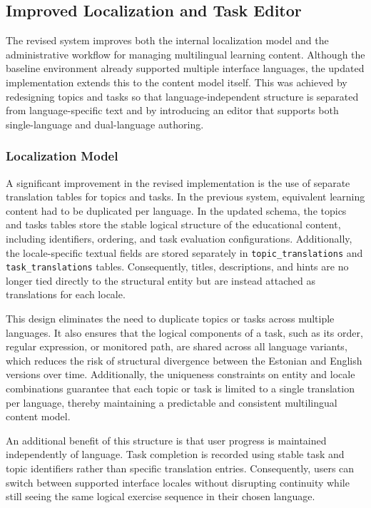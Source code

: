 \subsection{Improved Localization and Task Editor} \label{subsec:improved-localization-and-task-editor}
The revised system improves both the internal localization model and the administrative workflow for managing multilingual learning content.
Although the baseline environment already supported multiple interface languages, the updated implementation extends this to the content model itself.
This was achieved by redesigning topics and tasks so that language-independent structure is separated from language-specific text and by introducing an editor that supports both single-language and dual-language authoring.

\subsubsection{Localization Model} \label{subsubsec:localization-model}
A significant improvement in the revised implementation is the use of separate translation tables for topics and tasks.
In the previous system, equivalent learning content had to be duplicated per language.
In the updated schema, the topics and tasks tables store the stable logical structure of the educational content, including identifiers, ordering, and task evaluation configurations.
Additionally, the locale-specific textual fields are stored separately in \texttt{topic\_translations} and \texttt{task\_translations} tables.
Consequently, titles, descriptions, and hints are no longer tied directly to the structural entity but are instead attached as translations for each locale.

This design eliminates the need to duplicate topics or tasks across multiple languages.
It also ensures that the logical components of a task, such as its order, regular expression, or monitored path, are shared across all language variants, which reduces the risk of structural divergence between the Estonian and English versions over time.
Additionally, the uniqueness constraints on entity and locale combinations guarantee that each topic or task is limited to a single translation per language, thereby maintaining a predictable and consistent multilingual content model.

An additional benefit of this structure is that user progress is maintained independently of language.
Task completion is recorded using stable task and topic identifiers rather than specific translation entries.
Consequently, users can switch between supported interface locales without disrupting continuity while still seeing the same logical exercise sequence in their chosen language.

